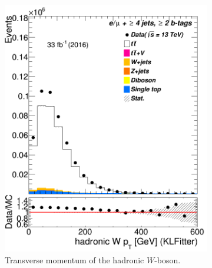 \begin{figure}
	\begin{subfigure}{0.25\textwidth}
		\includegraphics[width=\linewidth]{ControlPlots_emujets_2016_4incl_2incl/klf_Whad_pt_emujets_2016.png}
		\caption{Transverse momentum of the hadronic $W$-boson.} \label{fig:K24}
	\end{subfigure}
	\hspace*{0.5cm}
			\begin{subfigure}{0.25\textwidth}

\end{subfigure}
\end{figure}
